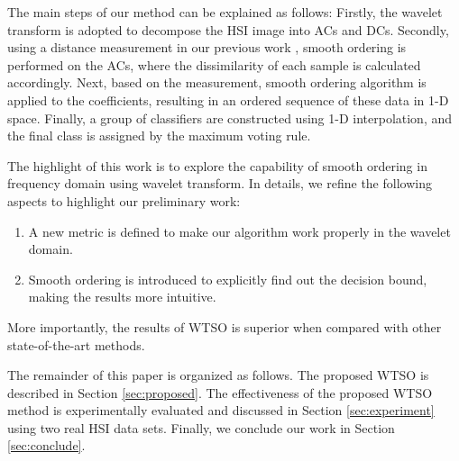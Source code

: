 \documentclass{ws-ijwmip}
\begin{document}
The main steps of our method can be explained as follows:
Firstly, the wavelet transform is adopted to decompose the HSI image into ACs and DCs.
Secondly, using a distance measurement in our previous work \cite{31},
smooth ordering is performed on the ACs, where the dissimilarity of each sample is calculated accordingly.
Next, based on the measurement, smooth ordering algorithm is applied to the coefficients,
resulting in an ordered sequence of these data in 1-D space.
Finally, a group of  classifiers are constructed using 1-D interpolation,
and the final class is assigned by the maximum voting rule.



The highlight of this work is to explore the capability of smooth ordering in frequency domain using wavelet transform. In details, we refine the following aspects to highlight our preliminary work: 
\begin{enumerate}
\item A new metric is defined to make our algorithm work properly in the wavelet domain. 
\item Smooth ordering is introduced to explicitly find out the decision bound, making the results more intuitive. 
\end{enumerate}
More importantly, the results of WTSO is superior when compared with other state-of-the-art methods.

%


The remainder of this paper is organized as follows. The proposed WTSO is described in Section \ref{sec:proposed}. The effectiveness of the proposed WTSO method is experimentally evaluated and discussed in Section \ref{sec:experiment} using two real HSI data sets. Finally, we conclude our work in Section \ref{sec:conclude}.
\end{document}

